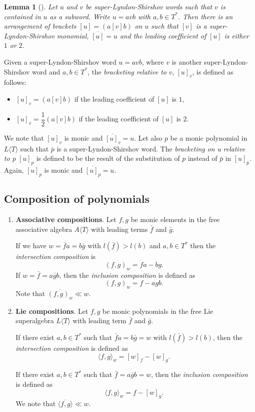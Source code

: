 \documentclass[reqno]{amsart}
\newtheorem{lemma}[theorem]{Lemma}
\theoremstyle{definition}
\theoremstyle{remark}
\numberwithin{equation}{section}
\begin{document}
\begin{lemma}[\cite{B2}]
Let $u$ and $v$ be super-Lyndon-Shirshov words such that $v$ is contained in $u$ as a subword. Write $u=avb$ with $a,b\in T^{\ast}$. Then there is an arrangement of brackets $[u]=(a[v]b)$
on $u$ such that $[v]$ is a super-Lyndon-Shirshov monomial, $\overline{[u]}=u$ and the leading coefficient of $[u]$ is either $1$ or $2$.
\end{lemma}
Given a super-Lyndon-Shirshov word $u=avb$, where $v$ is another super-Lyndon-Shirshov word and $a,b\in T^{\ast}$, the \emph{bracketing relative to}  $v$, $[u]_v$,  is defined as follows:
\begin{itemize}
    \item [(i)] $[u]_v=(a[v]b)$ if the leading coefficient of $[u]$ is $1$,
    \item[(ii)] $[u]_v=\dfrac{1}{2}(a[v]b)$ if the leading coefficient of $[u]$ is $2$.
\end{itemize}
We note that $[u]_v$ is monic and $\overline{[u]_v}=u$. Let also $p$ be a monic polynomial in $L\langle T\rangle$ such that $\bar{p}$ is a super-Lyndon-Shirshov word. The \emph{bracketing on u relative to p} $[u]_p$ is defined to be the result of the substitution of $p$ instead of $\bar{p}$ in $[u]_{\bar{p}}$. Again, $[u]_p$ is monic and $\overline{[u]_p}=u$.

\subsection*{Composition of polynomials}
\begin{enumerate}
    \item \textbf{Associative compositions}. Let $f,g$ be monic elements in the free associative algebra $A\langle T \rangle$ with leading terms $\bar{f}$ and $\bar{g}$.

   If we have $w=\bar{f}a=b\bar{g}$ with $l(\bar{f}) > l(b)$ and $a,b \in T^{\ast}$ then the \emph{intersection composition} is
    \[ (f,g)_w=fa - bg.\]
     If $w=\bar{f}=a \bar{g} b $, then the \emph{inclusion composition} is defined as
    \[(f,g)_w=f-agb .\] Note that $\overline{(f,g)_w} \ll w$.
    \item \textbf{Lie compositions}. Let $f,g$ be monic polynomials in the free Lie superalgebra $L\langle T \rangle$ with leading term $\bar{f}$ and $\bar{g}$.

    If there exist $a,b \in T^{\ast}$ such that $\bar{f}a=b\bar{g}=w$ with $l(\bar{f}) > l(b)$, then the \emph{intersection composition} is defined as
    \[ \langle f,g \rangle_{w} = [w]_f - [w]_g .\]

    If there exist $a,b \in T^{\ast}$ such that $\bar{f}=a\bar{g}b=w$, then the \emph{inclusion composition} is defined as
    \[ \langle f,g \rangle_w=f-[w]_g .\] We note that $ \overline{\langle f,g \rangle} \ll w$.
\end{enumerate}
\end{document}
